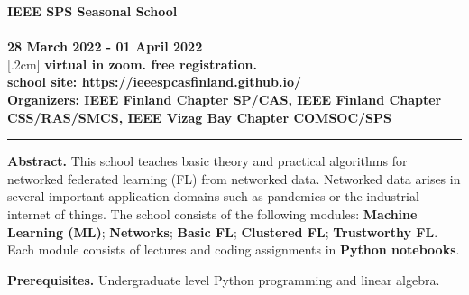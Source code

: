 \documentclass[12pt,epsf]{article}
\begin{document}
	\vspace*{10mm}

\begin{framed}
\begin{center}
\Large{\bf IEEE SPS Seasonal School}\\[.3cm]
		\\[.4cm]
\large{\bf 28 March 2022 - 01 April 2022}\\ 
[.2cm]
{\bf virtual in zoom. free registration. } \\[3mm]
{\bf school site: \url{https://ieeespcasfinland.github.io/} }\\[3mm]
{\bf Organizers: IEEE Finland Chapter SP/CAS, IEEE Finland Chapter CSS/RAS/SMCS, IEEE Vizag Bay Chapter COMSOC/SPS  }
\rule{10cm}{.3mm} \vspace*{-0cm}
\end{center}

\renewcommand{\baselinestretch}{.95}\small\normalsize
\vspace*{-4mm}
\large

{\bf Abstract.}
This school teaches basic theory and practical algorithms for networked federated learning (FL) from networked data. Networked data arises in several important application domains such as pandemics or the industrial internet of things. The school consists of the following modules: {\bf Machine Learning (ML)}; {\bf Networks}; {\bf Basic FL}; {\bf Clustered FL}; {\bf Trustworthy FL}. Each module consists of lectures and coding assignments in {\bf Python notebooks}.  

\vspace*{2mm}
{\bf Prerequisites.} Undergraduate level Python programming and linear algebra. 


\end{framed}
\end{document}
